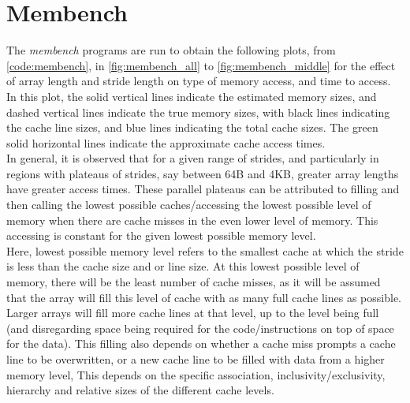 \documentclass[letterpaper]{article}
\title{\large \doctitle}
\author{}
\date{}%
\begin{document}
\maketitle
\pagestyle{fancy}




\section{Membench}
The \textit{membench} programs are run to obtain the following plots, from \cref{code:membench}, in \cref{fig:membench_all} to \cref{fig:membench_middle} for the effect of array length and stride length on type of memory access, and time to access. \\ 

In this plot, the solid vertical lines indicate the estimated memory sizes, and dashed vertical lines indicate the true memory sizes, with black lines indicating the cache line sizes, and blue lines indicating the total cache sizes. The green solid horizontal lines indicate the approximate cache access times. \\

In general, it is observed that for a given range of strides, and particularly in regions with plateaus of strides, say between 64B and 4KB, greater array lengths have greater access times. These parallel plateaus can be attributed to filling and then calling the lowest possible caches/accessing the lowest possible level of memory when there are cache misses in the even lower level of memory. This accessing is constant for the given lowest possible memory level. \\

Here, lowest possible memory level refers to the smallest cache at which the stride is less than the cache size and or line size. At this lowest possible level of memory, there will be the least number of cache misses, as it will be assumed that the array will fill this level of cache with as many full cache lines as possible. Larger arrays will fill more cache lines at that level, up to the level being full (and disregarding space being required for the code/instructions on top of space for the data). This filling also depends on whether a cache miss prompts a cache line to be overwritten, or a new cache line to be filled with data from a higher memory level, This depends on the specific association, inclusivity/exclusivity, hierarchy and relative sizes of the different cache levels. \\
\end{document}
